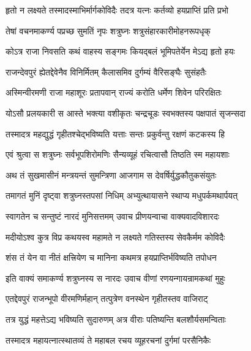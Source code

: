 \twolineshloka
{हृतो न लक्ष्यते तस्मादस्माभिर्मार्गकोविदैः}
{तदत्र यत्नः कर्तव्यो हयप्राप्तिं प्रति प्रभो}%

\twolineshloka
{तेषां वचनमाकर्ण्य पप्रच्छ सुमतिं नृपः}
{शत्रुघ्नः शत्रुसंहारकारीमोहनरूपधृक्}%


\twolineshloka
{कोऽत्र राजा निवसति कथं वाहस्य सङ्गमः}
{कियद्बलं भूमिपतेर्येन मेऽद्य हृतो हयः}%


\twolineshloka
{राजन्देवपुरं ह्येतद्देवेनैव विनिर्मितम्}
{कैलासमिव दुर्गम्यं वैरिसङ्घैः सुसंहतैः}%

\twolineshloka
{अस्मिन्वीरमणी राजा महाशूरः प्रतापवान्}
{राज्यं करोति धर्मेण शिवेन परिरक्षितः}%

\twolineshloka
{योऽसौ प्रलयकारी स आस्ते भक्त्या वशीकृतः}
{चन्द्रचूडः स्वभक्तस्य पक्षपातं सृजन्सदा}%

\twolineshloka
{तस्मादत्र महद्युद्धं गृहीतश्चेद्भविष्यति}
{यत्ताः सन्तः प्रकुर्वन्तु रक्षणं कटकस्य हि}%

\twolineshloka
{एवं श्रुत्वा स शत्रुघ्नः सर्वभूपशिरोमणिः}
{सैन्यव्यूहं रचित्वासौ तिष्ठति स्म महायशाः}%

\twolineshloka
{अथ तं सुखमासीनं मन्त्रयन्तं सुमन्त्रिणा}
{आजगाम स देवर्षिर्युद्धकौतुकसंयुतः}%

\twolineshloka
{तमागतं मुनिं दृष्ट्वा शत्रुघ्नस्तपसां निधिम्}
{अभ्युत्थायासने स्थाप्य मधुपर्कमथार्पयत्}%

\twolineshloka
{स्वागतेन च सन्तुष्टं नारदं मुनिसत्तमम्}
{उवाच प्रीणयन्वाचा वाक्यवादविशारदः}%


\twolineshloka
{मदीयोऽश्व कुत्र विप्र कथयस्व महामते}
{न लक्ष्यते गतिस्तस्य सेवकैर्मम कोविदैः}%

\twolineshloka
{शंस तं येन वा नीतं क्षत्त्रियेण च मानिना}
{कथमत्र हयप्राप्तिर्भविष्यति तपोधन}%

\twolineshloka
{इति वाक्यं समाकर्ण्य शत्रुघ्नस्य स नारदः}
{उवाच वीणां रणयन्गायन्रामकथां मुहुः}%


\twolineshloka
{एतद्देवपुरं राजन्भूपो वीरमणिर्महान्}
{तत्पुत्रेण वनस्थेन गृहीतस्तव वाजिराट्}%

\twolineshloka
{तत्र युद्धं महत्तेऽद्य भविष्यति सुदारुणम्}
{अत्र वीराः पतिष्यन्ति बलशौर्यसमन्विताः}%

\twolineshloka
{तस्मादत्र महायत्नात्स्थातव्यं ते महाबल}
{रचय व्यूहरचनां दुर्गमां परसैनिकैः}%

